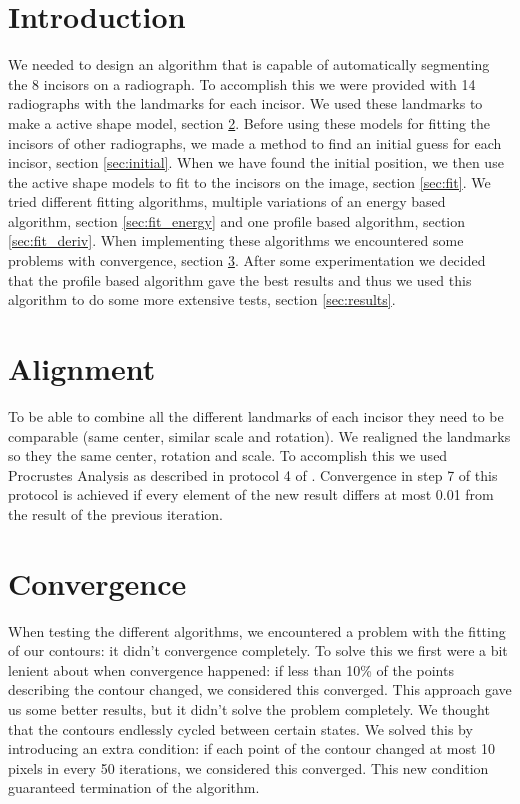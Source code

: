 \documentclass[a4paper,10pt]{article}
\begin{document}


\tableofcontents
\newpage

\section{Introduction}\label{sec:introduction}
We needed to design an algorithm that is capable of automatically segmenting the 8 incisors on a radiograph.
To accomplish this we were provided with 14 radiographs with the landmarks for each incisor. We used these landmarks to make a active shape model, section \ref{sec:alignment}. Before using these models for fitting the incisors of other radiographs, we made a method to find an initial guess for each incisor, section \ref{sec:initial}. When we have found the initial position, we then use the active shape models to fit to the incisors on the image, section \ref{sec:fit}. We tried different fitting algorithms, multiple variations of an energy based algorithm, section \ref{sec:fit_energy} and one profile based algorithm, section \ref{sec:fit_deriv}. When implementing these algorithms we encountered some problems with convergence, section \ref{sec:convergence}. After some experimentation we decided that the profile based algorithm gave the best results and thus we used this algorithm to do some more extensive tests, section \ref{sec:results}.


\section{Alignment} \label{sec:alignment}
To be able to combine all the different landmarks of each incisor they need to be comparable (same center, similar scale and rotation). We realigned the landmarks so they the same center, rotation and scale. To accomplish this we used Procrustes Analysis as described in protocol 4 of \cite{TemplateAlgorithm}. Convergence in step 7 of this protocol is achieved if every element of the new result differs at most 0.01 from the result of the previous iteration.

\section{Convergence}\label{sec:convergence}
When testing the different algorithms, we encountered a problem with the fitting of our contours: it didn't convergence completely. To solve this we first were a bit lenient about when convergence happened: if less than 10\% of the points describing the contour changed, we considered this converged. This approach gave us some better results, but it didn't solve the problem completely. We thought that the contours endlessly cycled between certain states. We solved this by introducing an extra condition: if each point of the contour changed at most 10 pixels in every 50 iterations, we considered this converged. This new condition guaranteed termination of the algorithm. 
\end{document}
